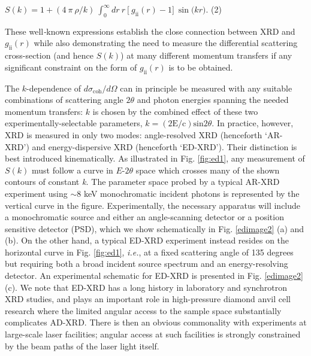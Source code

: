 \(S\left( k \right) = 1 + (4\ \pi\ \rho/k)\ \int_{0}^{\infty}{dr\ r\ \lbrack\ g_{\text{ii}}\left( r \right) - 1\rbrack}\ \sin{(kr})\).
(2)

These well\emph{-}known expressions establish the close connection
between XRD and \(g_{\text{ii}}\left( r \right)\) while also
demonstrating the need to measure the differential scattering
cross-section (and hence \(S(k)\)) at many different momentum transfers
if any significant constraint on the form of
\(g_{\text{ii}}\left( r \right)\) is to be obtained.

The \(k\)-dependence of \(d\sigma_{\text{coh}}/d\Omega\) can in
principle be measured with any suitable combinations of scattering angle
\(2\theta\) and photon energies spanning the needed momentum transfers:
\(k\) is chosen by the combined effect of these two
experimentally-selectable parameters,
\(k = \operatorname{(2E/c)sin}{2\theta}\). In practice, however, XRD is
measured in only two modes: angle-resolved XRD (henceforth `AR-XRD') and
energy-dispersive XRD (henceforth `ED-XRD'). Their distinction is best
introduced kinematically. As illustrated in Fig. \ref{fig:ed1}, any measurement of
\(S(k)\) must follow a curve in \(E\)-\(2\theta\) space which crosses
many of the shown contours of constant \emph{k.} The parameter space
probed by a typical AR-XRD experiment using $\sim 8$ keV
monochromatic incident photons is represented by the vertical curve in
the figure. Experimentally, the necessary apparatus will include a
monochromatic source and either an angle-scanning detector or a position
sensitive detector (PSD), which we show schematically in Fig. \ref{edimage2} (a) and
(b). On the other hand, a typical ED-XRD experiment instead resides on
the horizontal curve in Fig. \ref{fig:ed1}, \emph{i.e.}, at a fixed scattering angle
of 135 degrees but requiring both a broad incident source spectrum and
an energy-resolving detector. An experimental schematic for ED-XRD is
presented in Fig. \ref{edimage2}(c). We note that ED-XRD has a long history in
laboratory and synchrotron XRD studies, and plays an important role in
high-pressure diamond anvil cell research where the limited angular
access to the sample space substantially complicates
AD-XRD. \cite{feng2005energy, hoidn2014photometric, feng2007pressure, desgreniers1989tin, baublitz1981energy}
There is then an obvious commonality with experiments at large-scale
laser facilities; angular access at such facilities is strongly
constrained by the beam paths of the laser light itself.

